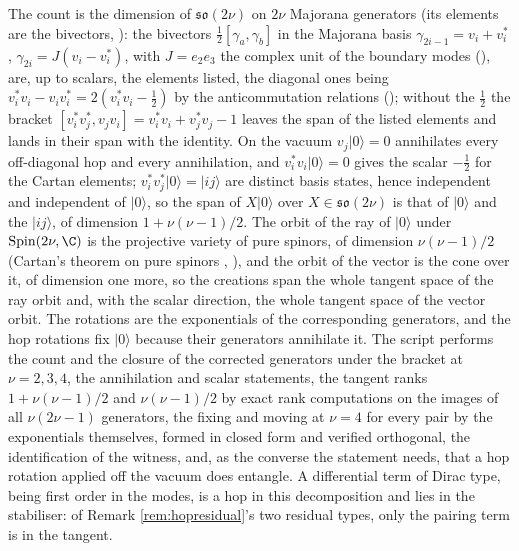 The count is the dimension of $\mathfrak{so}(2\nu)$ on $2\nu$ Majorana generators (its elements are the bivectors, ): the bivectors $\tfrac12[\gamma_a, \gamma_b]$ in the Majorana basis $\gamma_{2i-1} = v_i + v^*_i$, $\gamma_{2i} = J(v_i - v^*_i)$, with $J = e_2e_3$ the complex unit of the boundary modes (), are, up to scalars, the elements listed, the diagonal ones being $v^*_i v_i - v_i v^*_i = 2(v^*_i v_i - \tfrac12)$ by the anticommutation relations (); without the $\tfrac12$ the bracket $[v^*_i v^*_j, v_j v_i] = v^*_i v_i + v^*_j v_j - 1$ leaves the span of the listed elements and lands in their span with the identity. On the vacuum $v_j|0\rangle = 0$ annihilates every off-diagonal hop and every annihilation, and $v^*_i v_i|0\rangle = 0$ gives the scalar $-\tfrac12$ for the Cartan elements; $v^*_i v^*_j|0\rangle = |ij\rangle$ are distinct basis states, hence independent and independent of $|0\rangle$, so the span of $X|0\rangle$ over $X \in \mathfrak{so}(2\nu)$ is that of $|0\rangle$ and the $|ij\rangle$, of dimension $1 + \nu(\nu - 1)/2$. The orbit of the ray of $|0\rangle$ under $\mathrm{Spin}(2\nu, \C)$ is the projective variety of pure spinors, of dimension $\nu(\nu - 1)/2$ (Cartan's theorem on pure spinors \cite{Chevalley1954}, ), and the orbit of the vector is the cone over it, of dimension one more, so the creations span the whole tangent space of the ray orbit and, with the scalar direction, the whole tangent space of the vector orbit. The rotations are the exponentials of the corresponding generators, and the hop rotations fix $|0\rangle$ because their generators annihilate it. The script performs the count and the closure of the corrected generators under the bracket at $\nu = 2, 3, 4$, the annihilation and scalar statements, the tangent ranks $1 + \nu(\nu - 1)/2$ and $\nu(\nu - 1)/2$ by exact rank computations on the images of all $\nu(2\nu - 1)$ generators, the fixing and moving at $\nu = 4$ for every pair by the exponentials themselves, formed in closed form and verified orthogonal, the identification of the witness, and, as the converse the statement needs, that a hop rotation applied off the vacuum does entangle. A differential term of Dirac type, being first order in the modes, is a hop in this decomposition and lies in the stabiliser: of Remark \ref{rem:hopresidual}'s two residual types, only the pairing term is in the tangent.
